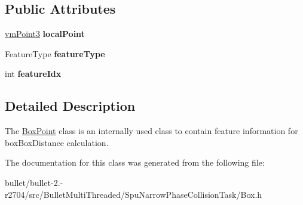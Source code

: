 \subsection*{Public Attributes}
\begin{DoxyCompactItemize}
\item 
\hypertarget{class_box_point_ab630d7c127183aa378820e9c8923bf23}{\hyperlink{class_vectormath_1_1_aos_1_1_point3}{vm\+Point3} {\bfseries local\+Point}}\label{class_box_point_ab630d7c127183aa378820e9c8923bf23}

\item 
\hypertarget{class_box_point_a5f8e28bd2da7a0c401374b17f9246084}{Feature\+Type {\bfseries feature\+Type}}\label{class_box_point_a5f8e28bd2da7a0c401374b17f9246084}

\item 
\hypertarget{class_box_point_a20eb8785d55cc6bdab7ce0207ece0b9a}{int {\bfseries feature\+Idx}}\label{class_box_point_a20eb8785d55cc6bdab7ce0207ece0b9a}

\end{DoxyCompactItemize}


\subsection{Detailed Description}
The \hyperlink{class_box_point}{Box\+Point} class is an internally used class to contain feature information for box\+Box\+Distance calculation. 

The documentation for this class was generated from the following file\+:\begin{DoxyCompactItemize}
\item 
bullet/bullet-\/2.-\/r2704/src/\+Bullet\+Multi\+Threaded/\+Spu\+Narrow\+Phase\+Collision\+Task/Box.\+h\end{DoxyCompactItemize}
